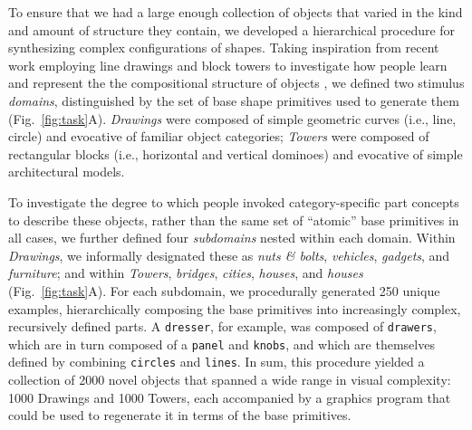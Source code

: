 \documentclass[10pt,letterpaper]{article}
\begin{document}


To ensure that we had a large enough collection of objects that varied in the kind and amount of structure they contain, we developed a hierarchical procedure for synthesizing complex configurations of shapes. 
Taking inspiration from recent work employing line drawings and block towers to investigate how people learn and represent the the compositional structure of objects , we defined two stimulus \textit{domains}, distinguished by the set of base shape primitives used to generate them (Fig.~\ref{fig:task}A).
\textit{Drawings} were composed of simple geometric curves (i.e., line, circle) and evocative of familiar object categories; \textit{Towers} were composed of rectangular blocks (i.e., horizontal and vertical dominoes) and evocative of simple architectural models.

To investigate the degree to which people invoked category-specific part concepts to describe these objects, rather than the same set of ``atomic'' base primitives in all cases, we further defined four \textit{subdomains} nested within each domain. 
Within \textit{Drawings}, we informally designated these as \textit{nuts \& bolts}, \textit{vehicles}, \textit{gadgets}, and \textit{furniture}; and within \textit{Towers}, \textit{bridges}, \textit{cities}, \textit{houses}, and \textit{houses} (Fig.~\ref{fig:task}A).
For each subdomain, we procedurally generated 250 unique examples, hierarchically composing the base primitives into increasingly complex, recursively defined parts. 
A \texttt{dresser}, for example, was composed of \texttt{drawers}, which are in turn composed of a \texttt{panel} and \texttt{knobs}, and which are themselves defined by combining \texttt{circles} and \texttt{lines}.
In sum, this procedure yielded a collection of 2000 novel objects that spanned a wide range in visual complexity: 1000 Drawings and 1000 Towers, each accompanied by a graphics program that could be used to regenerate it in terms of the base primitives.
\end{document}
